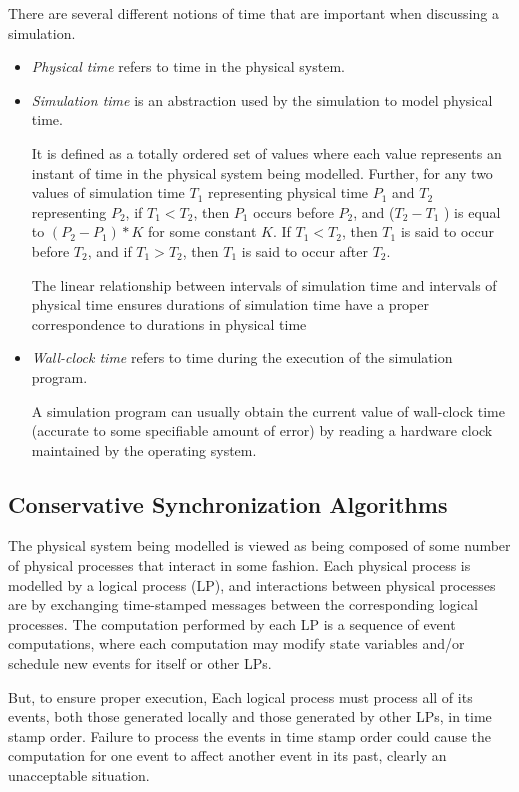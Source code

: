 \documentclass[12pt,a4paper]{article}
\begin{document}
	There are several different notions of time that are important when discussing a simulation.
	\begin{itemize}
	\item \emph{Physical time} refers to time in the physical system.
	\item \emph{Simulation time} is an abstraction used by the simulation to model physical time.
	
	It is defined as a totally ordered set of values where each value represents an instant of time in the physical system being modelled. Further, for any two values of simulation time $T_1$ representing physical time $P_1$ and $T_2$ representing $P_2$, if $T_1 < T_2$, then $P_1$ occurs before $P_2$, and ($T_2 - T_1$ ) is equal to $(P_2 - P_1) * K$ for some constant $K$. If $T_1 < T_2$, then $T_1$ is said to occur before $T_2$, and if $T_1 > T_2$, then $T_1$ is said to occur after $T_2$. 
	
	The linear relationship between intervals of simulation time and intervals of physical time ensures durations of simulation time have a proper correspondence to durations in physical time
	\item \emph{Wall-clock time} refers to time during the execution of the simulation program.
	
	A simulation program can usually obtain the current value of wall-clock time (accurate to some specifiable amount of error) by reading a hardware clock maintained by the operating system.
	\end{itemize}


\subsection{Conservative Synchronization Algorithms}
	The physical system being modelled is viewed as being composed of some number of physical processes that interact in some fashion. Each physical process is modelled by a logical process (LP), and interactions between physical processes are  by exchanging time-stamped messages between the corresponding logical processes. The computation performed by each LP is a sequence of event computations, where each computation may modify state variables and/or schedule new events for itself or other LPs.
	
	But, to ensure proper execution, Each logical process must process all of its events, both those generated locally and those
generated by other LPs, in time stamp order. Failure to process the events in time stamp order could cause the computation for one event to affect another event in its past, clearly an unacceptable situation.
\end{document}
